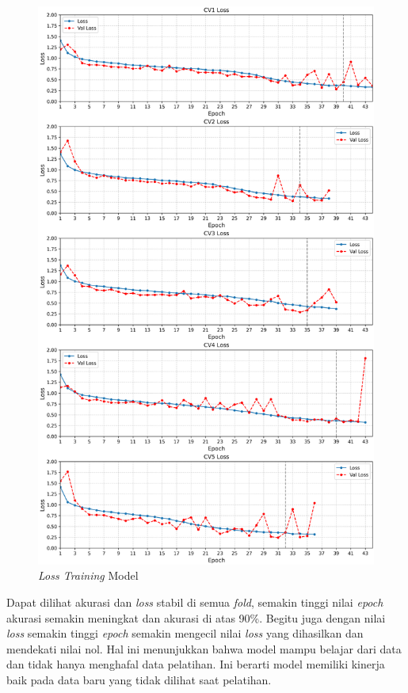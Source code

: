 \begin{table}[H]
          \begin{figure}[H]
              \centering
              \includegraphics[width=1.0\linewidth]{figures/bab4/loss_plotfix.png}
              \caption{\textit{Loss Training} Model}
              \label{Loss Training Model Terbaik}
          \end{figure}

    Dapat dilihat akurasi dan \textit{loss} stabil di semua \textit{fold}, semakin tinggi nilai \textit{epoch} akurasi semakin meningkat dan akurasi di atas 90\%. Begitu juga dengan nilai \textit{loss} semakin tinggi \textit{epoch} semakin mengecil nilai \textit{loss} yang dihasilkan dan mendekati nilai nol.  Hal ini menunjukkan bahwa model mampu belajar dari data dan tidak hanya menghafal data pelatihan. Ini berarti model memiliki kinerja baik pada data baru yang tidak dilihat saat pelatihan.




\end{table}
